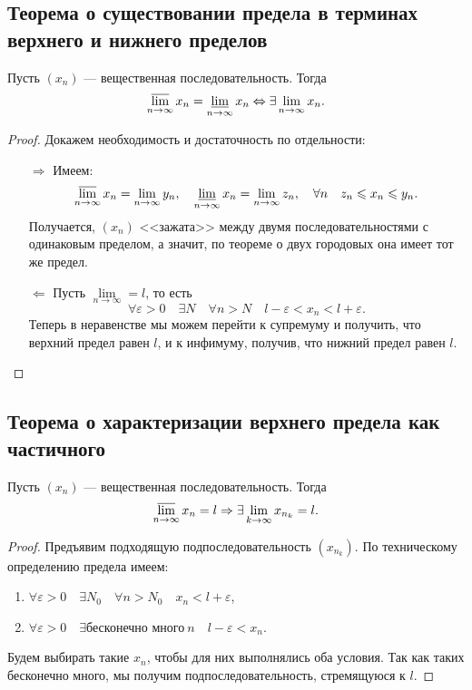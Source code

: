 \subsection{Теорема о существовании предела в терминах верхнего и нижнего пределов}

\begin{theorem}
	Пусть \((x_n)\) --- вещественная последовательность. Тогда \[
	\varlimsup_{n \to \infty} x_n = \varliminf_{n \to \infty} x_n \Leftrightarrow \exists \lim_{n \to \infty} x_n.
	\]
\end{theorem}

\begin{proof}
	Докажем необходимость и достаточность по отдельности:
	\begin{enumerate}
		\item[\(\Rightarrow\)] Имеем: \[
		\varlimsup_{n \to \infty} x_n = \lim_{n \to \infty} y_n, \quad
		\varliminf_{n \to \infty} x_n = \lim_{n \to \infty} z_n, \quad
		\forall n \quad z_n \leqslant x_n \leqslant y_n.
		\]
		Получается, \((x_n)\) <<зажата>> между двумя последовательностями с одинаковым пределом, а значит, по теореме о двух городовых она имеет тот же предел.
		\item[\(\Leftarrow\)] Пусть \(\lim\limits_{n \to \infty} = l\), то есть \[
		\forall \varepsilon > 0 \quad \exists N \quad \forall n > N \quad l - \varepsilon < x_n < l + \varepsilon.
		\]
		Теперь в неравенстве мы можем перейти к супремуму и получить, что верхний предел равен \(l\), и к инфимуму, получив, что нижний предел равен \(l\). 
	\end{enumerate} 
\end{proof}

\subsection{Теорема о характеризации верхнего предела как частичного}

\begin{theorem}
	Пусть \((x_n)\) --- вещественная последовательность. Тогда \[
	\varlimsup_{n \to \infty} x_n = l \Rightarrow \exists \lim_{k \to \infty} x_{n_k} = l.
	\]
\end{theorem}

\begin{proof}
	Предъявим подходящую подпоследовательность \((x_{n_k})\). По техническому определению предела имеем:
	\begin{enumerate}
		\item \(\forall \varepsilon > 0 \quad \exists N_0 \quad \forall n > N_0 \quad x_n < l + \varepsilon\),
		\item \(\forall \varepsilon > 0 \quad \exists \textit{бесконечно много} \ n \quad l - \varepsilon < x_n\).
	\end{enumerate}
	Будем выбирать такие \(x_n\), чтобы для них выполнялись оба условия. Так как таких бесконечно много, мы получим подпоследовательность, стремящуюся к \(l\).
\end{proof}

